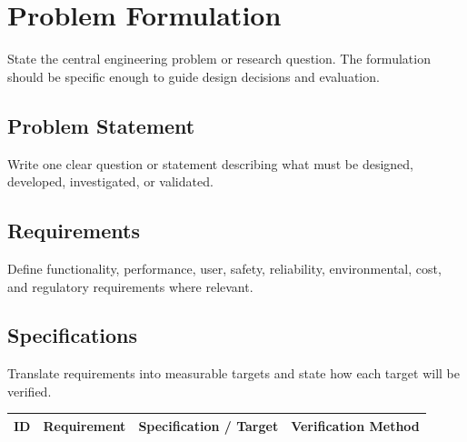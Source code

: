 \section{Problem Formulation}
State the central engineering problem or research question. 
The formulation should be specific enough to guide design 
decisions and evaluation.

\subsection{Problem Statement}
Write one clear question or statement describing what must 
be designed, developed, investigated, or validated. 

\subsection{Requirements}
Define functionality, performance, user, safety, reliability, 
environmental, cost, and regulatory requirements where relevant.

\subsection{Specifications}
Translate requirements into measurable targets and state how each target will be verified.

\begin{center}
    \begin{tabular}{| c | c | c | c |}
        \hline
        ID & Requirement & Specification / Target & Verification Method \\
        \hline 
    \end{tabular}
\end{center}
